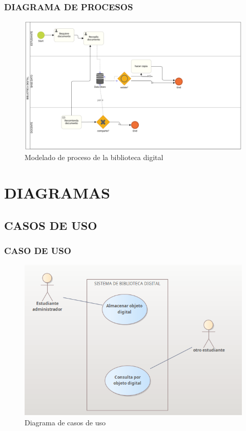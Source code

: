 \documentclass[article]{beamer}
\begin{document}
\begin{frame}[fragile]
\frametitle{DIAGRAMA DE PROCESOS}
\begin{figure}[ht]
	\centering
	\includegraphics[scale=0.4]{images/modeladoProceso1}
	\caption{Modelado de proceso de la biblioteca digital}
\end{figure}
\end{frame}


\section{DIAGRAMAS}
\subsection{CASOS DE USO}


\begin{frame}[fragile]
\frametitle{CASO DE USO}
\begin{figure}[ht]
	\centering
	\includegraphics[scale=0.5]{images/casoUso2}
	\caption{Diagrama de casos de uso}
\end{figure}

\end{frame}
\end{document}
